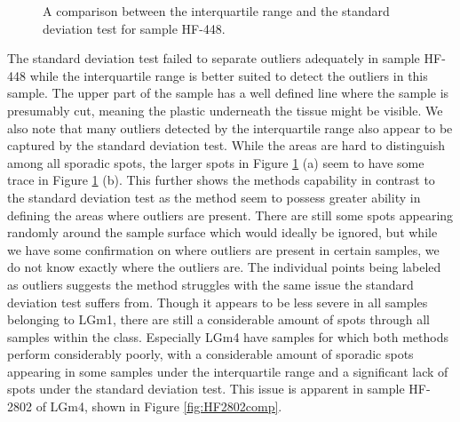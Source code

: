 \begin{figure}[H]

    \centering
    \qquad
    \caption{A comparison between the interquartile range and the standard deviation test for sample HF-448.
\label{fig:iqrHF448}}%
\end{figure}

The standard deviation test failed to separate outliers adequately in sample HF-448 while the interquartile range is better suited to detect the outliers in this sample. The upper part of the sample has a well defined line where the sample is presumably cut, meaning the plastic underneath the tissue might be visible. We also note that many outliers detected by the interquartile range also appear to be captured by the standard deviation test. While the areas are hard to distinguish among all sporadic spots, the larger spots in Figure \ref{fig:iqrHF448} (a) seem to have some trace in Figure \ref{fig:iqrHF448} (b). This further shows the methods capability in contrast to the standard deviation test as the method seem to possess greater ability in defining the areas where outliers are present. There are still some spots appearing randomly around the sample surface which would ideally be ignored, but while we have some confirmation on where outliers are present in certain samples, we do not know exactly where the outliers are. The individual points being labeled as outliers suggests the method struggles with the same issue the standard deviation test suffers from. Though it appears to be less severe in all samples belonging to LGm1, there are still a considerable amount of spots through all samples within the class. Especially LGm4 have samples for which both methods perform considerably poorly, with a considerable amount of sporadic spots appearing in some samples under the interquartile range and a significant lack of spots under the standard deviation test. This issue is apparent in sample HF-2802 of LGm4, shown in Figure \ref{fig:HF2802comp}.

